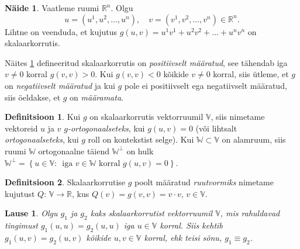 \documentclass[12pt,a4paper,oneside]{article}
\theoremstyle{plain}
\newtheorem{lause}{Lause}[section]
\theoremstyle{definition}
\newtheorem{definitsioon}{Definitsioon}[section]
\newtheorem{naide}{Näide}[section]
\numberwithin{equation}{section}
\def\R{{\mathbb R}}
\def\V{{\mathbb V}}
\begin{document}
\begin{naide} \label{naide:skalaarkorrutis}
Vaatleme ruumi $\R^{n}$. Olgu 
\[u = \left(u^1, u^2, \dots, u^n \right), \quad
v = \left(v^1, v^2, \dots, v^n \right) \in \R^{n}.\] 
Lihtne on veenduda, et kujutus $g \left(u, v \right) = 
u^1v^1 + u^2v^2 + \dots + u^n v^n$ on skalaarkorrutis.
\end{naide}

Näites \ref{naide:skalaarkorrutis} defineeritud skalaarkorrutis on \emph{positiivselt määratud}, 
see tähendab iga $v \neq 0$ korral $g \left(v, v \right) > 0$. Kui 
$g \left(v, v \right) < 0$ kõikide $v \neq 0$ korral, siis ütleme, 
et $g$ on \emph{negatiivselt määratud} ja kui $g$ pole ei positiivselt 
ega negatiivselt määratud, siis öeldakse, et $g$ on \emph{määramata}.

\begin{definitsioon}
Kui $g$ on skalaarkorrutis vektorruumil $\V$, siis nimetame 
vektoreid $u$ ja $v$ \emph{$g$-ortogonaalseteks}, kui 
$g \left( u, v \right) = 0$ (või lihtsalt 
\emph{ortogonaalseteks}, kui $g$ roll on kontekstist selge). 
Kui $\mathbb{W} \subset \V$ 
on alamruum, siis ruumi $\mathbb{W}$ ortogonaalne täiend 
$\mathbb{W}^{\perp}$ on hulk $\mathbb{W}^{\perp} = \left\lbrace u \in 
\V \colon\, \text{ iga } v \in  \mathbb{W} \text{ korral } 
g \left(u, v \right) = 0 \right\rbrace$.
\end{definitsioon}
\begin{definitsioon}
Skalaarkorrutise $g$ poolt määratud \emph{ruutvormiks} nimetame 
kujutust $Q \colon\, \V \rightarrow \R$, kus 
$Q \left( v \right) = g\left(v, v\right) = v \cdot v$, $v \in 
\V$.
\end{definitsioon}

\begin{lause} \label{lause:skalaarkorrutise-yhesus}
Olgu $g_1$ ja $g_2$ kaks skalaarkorrutist vektorruumil $\V$, 
mis rahuldavad tingimust $g_1 \left(u, u \right) = 
g_2 \left(u, u \right)$ iga $u \in \V$ korral. Siis kehtib 
$g_1 \left(u, v \right) = g_2 \left(u, v \right)$ kõikide 
$u, v \in \V$ korral, ehk teisi sõnu, $g_1 \equiv g_2$.
\end{lause}
\end{document}
